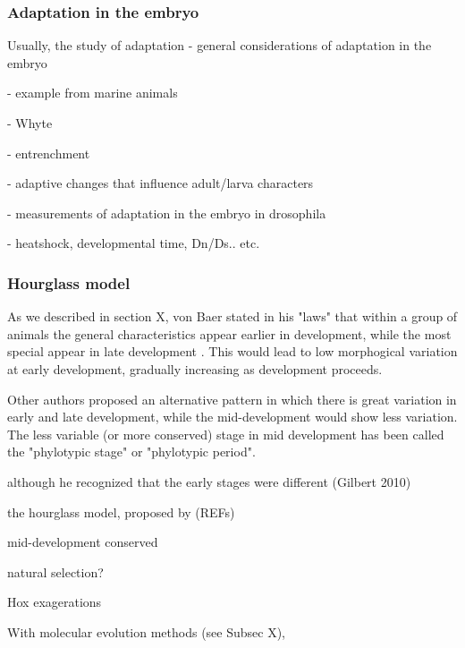 

\subsubsection{Adaptation in the embryo}

Usually, the study of adaptation
- general considerations of adaptation in the embryo

- example from marine animals

- Whyte

- entrenchment

- adaptive changes that influence adult/larva characters

- measurements of adaptation in the embryo in drosophila

- heatshock, developmental time, Dn/Ds.. etc.


\subsubsection{Hourglass model}

As we described in section X, von Baer stated in his "laws" that within a group of animals the general characteristics appear earlier in development, while the most special appear in late development \citep{vonBaer1828uber}.
This would lead to low morphogical variation at early development, gradually increasing as development proceeds.

Other authors \citep{Medawar1954,Slack1993,Duboule1994,Raff1996} proposed an alternative pattern in which there is great variation in early and late development, while the mid-development would show less variation.
The less variable (or more conserved) stage in mid development has been called the "phylotypic stage" or "phylotypic period".


although he recognized that the early stages were different (Gilbert 2010)

the hourglass model, proposed by (REFs)

mid-development conserved

natural selection?

Hox exagerations

With molecular evolution methods (see Subsec X), 

